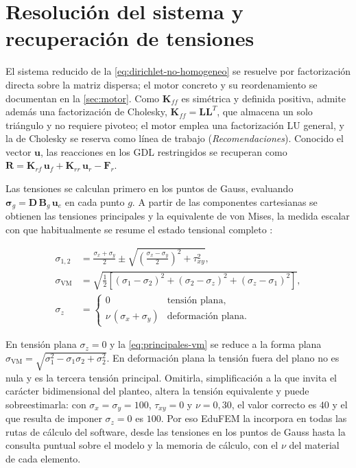 \section{Resolución del sistema y recuperación de tensiones}
\label{sec:resolucion-tensiones}

El sistema reducido de la \autoref{eq:dirichlet-no-homogeneo} se resuelve por factorización directa sobre la matriz dispersa; el motor concreto y su reordenamiento se documentan en la \autoref{sec:motor}. Como $\bm{K}_{ff}$ es simétrica y definida positiva, admite además una factorización de Cholesky, $\bm{K}_{ff} = \bm{L}\bm{L}^{T}$, que almacena un solo triángulo y no requiere pivoteo; el motor emplea una factorización LU general, y la de Cholesky se reserva como línea de trabajo (\emph{Recomendaciones}). Conocido el vector $\bm{u}$, las reacciones en los GDL restringidos se recuperan como $\bm{R} = \bm{K}_{rf}\,\bm{u}_f + \bm{K}_{rr}\,\bm{u}_r - \bm{F}_r$.

Las tensiones se calculan primero en los puntos de Gauss, evaluando $\bm{\sigma}_g = \bm{D}\,\bm{B}_g\,\bm{u}_e$ en cada punto $g$. A partir de las componentes cartesianas se obtienen las tensiones principales \autocite[pp.~12-14]{timoshenko1970elasticity} y la equivalente de von Mises, la medida escalar con que habitualmente se resume el estado tensional completo \autocite[p.~117]{cook2002concepts}:

\begin{equation}
\begin{aligned}
\sigma_{1,2} &= \frac{\sigma_x + \sigma_y}{2} \pm \sqrt{\left(\frac{\sigma_x - \sigma_y}{2}\right)^2 + \tau_{xy}^2}, \\
\sigma_{\mathrm{VM}} &= \sqrt{\tfrac{1}{2}\left[(\sigma_1-\sigma_2)^2 + (\sigma_2-\sigma_z)^2 + (\sigma_z-\sigma_1)^2\right]}, \\
\sigma_z &=
\begin{cases}
0 & \text{tensión plana,}\\
\nu\,(\sigma_x+\sigma_y) & \text{deformación plana.}
\end{cases}
\end{aligned}
\label{eq:principales-vm}
\end{equation}

En tensión plana $\sigma_z = 0$ y la \autoref{eq:principales-vm} se reduce a la forma plana $\sigma_{\mathrm{VM}} = \sqrt{\sigma_1^2 - \sigma_1\sigma_2 + \sigma_2^2}$. En deformación plana la tensión fuera del plano no es nula y es la tercera tensión principal. Omitirla, simplificación a la que invita el carácter bidimensional del planteo, altera la tensión equivalente y puede sobreestimarla: con $\sigma_x = \sigma_y = 100$, $\tau_{xy} = 0$ y $\nu = 0{,}30$, el valor correcto es $40$ y el que resulta de imponer $\sigma_z = 0$ es $100$. Por eso EduFEM la incorpora en todas las rutas de cálculo del software, desde las tensiones en los puntos de Gauss hasta la consulta puntual sobre el modelo y la memoria de cálculo, con el $\nu$ del material de cada elemento.

